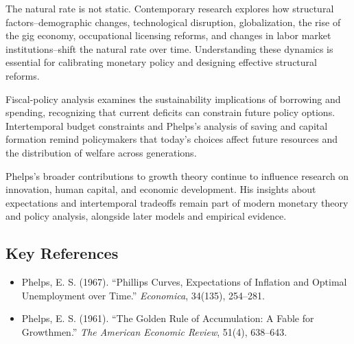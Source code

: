 The natural rate is not static. Contemporary research explores how structural
factors--demographic changes, technological disruption, globalization, the
rise of the gig economy, occupational licensing reforms, and changes in labor
market institutions--shift the natural rate over time. Understanding these
dynamics is essential for calibrating monetary policy and designing effective
structural reforms.

Fiscal-policy analysis examines the sustainability implications of borrowing and
spending, recognizing that current deficits can constrain future policy options.
Intertemporal budget constraints and Phelps's analysis of saving and capital
formation remind policymakers that today's choices affect future resources and
the distribution of welfare across generations.

Phelps's broader contributions to growth theory continue to influence research
on innovation, human capital, and economic development. His insights about
expectations and intertemporal tradeoffs remain part of modern monetary theory
and policy analysis, alongside later models and empirical evidence.

\subsection*{Key References}
\begin{itemize}
    \item Phelps, E. S. (1967). ``Phillips Curves, Expectations of Inflation and Optimal Unemployment over Time.'' \textit{Economica}, 34(135), 254--281.
    \item Phelps, E. S. (1961). ``The Golden Rule of Accumulation: A Fable for Growthmen.'' \textit{The American Economic Review}, 51(4), 638--643.
\end{itemize}
